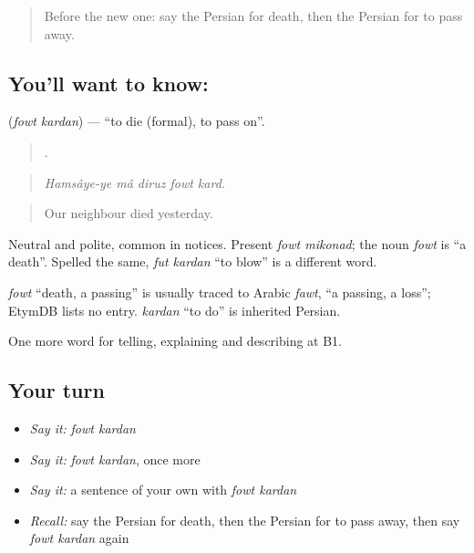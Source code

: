 \label{lesson:FA-C337-fowt-kardan}



\begin{quote}
Before the new one: say the Persian for death, then the Persian for to pass away.
\end{quote}

\subsection*{You'll want to know:  }
\textbf{ } (\emph{fowt kardan}) — \textquotedblleft{}to die (formal), to pass on\textquotedblright{}.

\begin{quote}
    .
\end{quote}

\begin{quote}
\emph{Hamsâye-ye mâ diruz fowt kard.}
\end{quote}

\begin{quote}
Our neighbour died yesterday.
\end{quote}

Neutral and polite, common in notices. Present \emph{fowt mikonad}; the noun \emph{fowt} is \textquotedblleft{}a death\textquotedblright{}. Spelled the same, \emph{fut kardan} \textquotedblleft{}to blow\textquotedblright{} is a different word.

\begin{cousinweb}
\emph{fowt} \textquotedblleft{}death, a passing\textquotedblright{} is usually traced to Arabic \emph{fawt}, \textquotedblleft{}a passing, a loss\textquotedblright{}; EtymDB lists no entry. \emph{kardan} \textquotedblleft{}to do\textquotedblright{} is inherited Persian.
\end{cousinweb}

\begin{grammarlens}[title={What you've built}]
One more word for telling, explaining and describing at B1.
\end{grammarlens}

\subsection*{Your turn}
\begin{itemize}
\raggedright
  \item \emph{Say it:} \emph{fowt kardan}
  \item \emph{Say it:} \emph{fowt kardan}, once more
  \item \emph{Say it:} a sentence of your own with \emph{fowt kardan}
  \item \emph{Recall:} say the Persian for death, then the Persian for to pass away, then say \emph{fowt kardan} again
\end{itemize}

